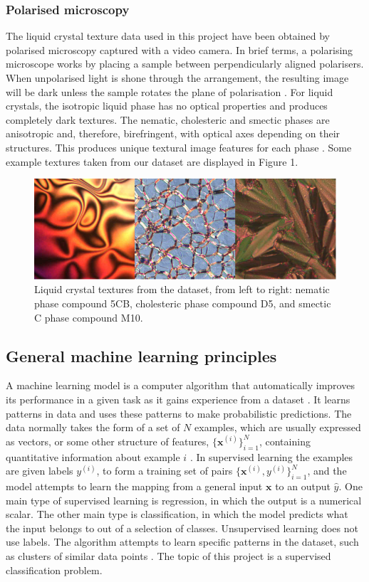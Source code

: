 \documentclass[12pt]{article}
\begin{document}
\subsubsection{Polarised microscopy}
The liquid crystal texture data used in this project have been obtained by polarised microscopy captured with a video camera. In brief terms, a polarising microscope works by placing a sample between perpendicularly aligned polarisers. When unpolarised light is shone through the arrangement, the resulting image will be dark unless the sample rotates the plane of polarisation \cite{Dierking03}. For liquid crystals, the isotropic liquid phase has no optical properties and produces completely dark textures. The nematic, cholesteric and smectic phases are anisotropic and, therefore, birefringent, with optical axes depending on their structures. This produces unique textural image features for each phase \cite{Dierking03}. Some example textures taken from our dataset are displayed in Figure 1.

\begin{figure}[!htb]
\centering
\includegraphics[width=6in]{images/texture_samples.png}
\caption{Liquid crystal textures from the dataset, from left to right: nematic phase compound 5CB, cholesteric phase compound D5, and smectic C phase compound M10.}
\end{figure}
\subsection{General machine learning principles}
A machine learning model is a computer algorithm that automatically improves its performance in a given task as it gains experience from a dataset \cite{Goodfellow16}. It learns patterns in data and uses these patterns to make probabilistic predictions. The data normally takes the form of a set of $N$ examples, which are usually expressed as vectors, or some other structure of features, $\{\bm{x}^{(i)}\}_{i=1}^N$, containing quantitative information about example $i$ \cite{Murphy12}. In supervised learning the examples are given labels $y^{(i)}$, to form a training set of pairs $\{\bm{x}^{(i)}, y^{(i)}\}_{i=1}^N$, and the model attempts to learn the mapping from a general input $\bm{x}$ to an output $\hat{y}$. One main type of supervised learning is regression, in which the output is a numerical scalar. The other main type is classification, in which the model predicts what the input belongs to out of a selection of classes. Unsupervised learning does not use labels. The algorithm attempts to learn specific patterns in the dataset, such as clusters of similar data points \cite{Murphy12}. The topic of this project is a supervised classification problem.
\end{document}
